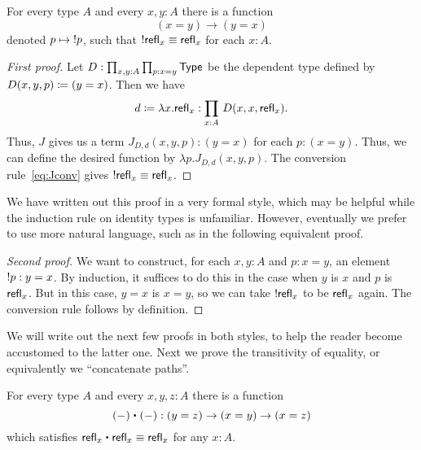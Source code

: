 \begin{lem}\label{lem:opp}
  For every type $A$ and every $x,y:A$ there is a function
  \begin{equation*}
    (x= y)\to(y= x)
  \end{equation*}
  denoted $p\mapsto \mathord{!{p}}$, such that $\mathord{!{\mathsf{refl}_{x}}}\equiv\mathsf{refl}_{x}$ for each $x:A$.
\end{lem}
\begin{proof}[First proof]
  Let $D:\prod_{x,y:A} \prod_{p:x= y} \mathsf{Type}$ be the dependent type defined by $D(x,y,p)\coloneqq (y= x)$.
  Then we have
  \begin{equation*}
    d\coloneqq \lambda x.\mathsf{refl}_{x}:\prod_{x:A}\, D(x,x,\mathsf{refl}_{x}).
  \end{equation*}
  Thus, $J$ gives us a term $J_{D,d}(x,y,p): (y= x)$ for each $p:(x= y)$.
  Thus, we can define the desired function by $\lambda p. J_{D,d}(x,y,p)$.
  The conversion rule~\eqref{eq:Jconv} gives $\mathord{!{\mathsf{refl}_{x}}}\equiv \mathsf{refl}_{x}$.
\end{proof}

We have written out this proof in a very formal style, which may be helpful while the induction rule on identity types is unfamiliar.
However, eventually we prefer to use more natural language, such as in the following equivalent proof.

\begin{proof}[Second proof]
  We want to construct, for each $x,y:A$ and $p:x=y$, an element $\mathord{!{p}}:y=x$.
  By induction, it suffices to do this in the case when $y$ is $x$ and $p$ is $\mathsf{refl}_{x}$.
  But in this case, $y=x$ is $x=y$, so we can take $\mathord{!{\mathsf{refl}_{x}}}$ to be $\mathsf{refl}_{x}$ again.
  The conversion rule follows by definition.
\end{proof}

We will write out the next few proofs in both styles, to help the reader become accustomed to the latter one.
Next we prove the transitivity of equality, or equivalently we ``concatenate paths''.

\begin{lem}\label{lem:concat}
  For every type $A$ and every $x,y,z:A$ there is a function
  \begin{equation*}
    {(-)}\ct{(-)}:(y= z)\to (x= y)\to (x=  z)
  \end{equation*}
  which satisfies $\refl{x}\ct \refl{x}\jdeq \refl{x}$ for any $x:A$.
\end{lem}

